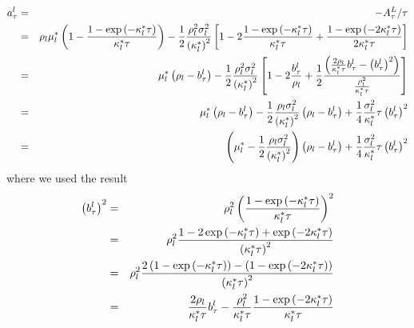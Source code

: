 \documentclass{article}
\begin{document}
\begin{eqnarray*}
a_{\tau }^{l} &=&-A_{\tau }^{L}/\tau  \\
&=&\rho _{l}\mu _{l}^{\ast }\left( 1-\frac{1-\exp \left( -\kappa _{l}^{\ast
}\tau \right) }{\kappa _{l}^{\ast }\tau }\right) -\frac{1}{2}\frac{\rho
_{l}^{2}\sigma _{l}^{2}}{\left( \kappa _{l}^{\ast }\right) ^{2}}\left[ 1-2%
\frac{1-\exp \left( -\kappa _{l}^{\ast }\tau \right) }{\kappa _{l}^{\ast
}\tau }+\frac{1-\exp \left( -2\kappa _{l}^{\ast }\tau \right) }{2\kappa
_{l}^{\ast }\tau }\right]  \\
&=&\mu _{l}^{\ast }\left( \rho _{l}-b_{\tau }^{l}\right) -\frac{1}{2}\frac{%
\rho _{l}^{2}\sigma _{l}^{2}}{\left( \kappa _{l}^{\ast }\right) ^{2}}\left[
1-2\frac{b_{\tau }^{l}}{\rho _{l}}+\frac{1}{2}\frac{\left( \frac{2\rho _{l}}{%
\kappa _{l}^{\ast }\tau }b_{\tau }^{l}-\left( b_{\tau }^{l}\right)
^{2}\right) }{\frac{\rho _{l}^{2}}{\kappa _{l}^{\ast }\tau }}\right]  \\
&=&\mu _{l}^{\ast }\left( \rho _{l}-b_{\tau }^{l}\right) -\frac{1}{2}\frac{%
\rho _{l}\sigma _{l}^{2}}{\left( \kappa _{l}^{\ast }\right) ^{2}}\left( \rho
_{l}-b_{\tau }^{l}\right) +\frac{1}{4}\frac{\sigma _{l}^{2}}{\kappa
_{l}^{\ast }}\tau \left( b_{\tau }^{l}\right) ^{2} \\
&=&\left( \mu _{l}^{\ast }-\frac{1}{2}\frac{\rho _{l}\sigma _{l}^{2}}{\left(
\kappa _{l}^{\ast }\right) ^{2}}\right) \left( \rho _{l}-b_{\tau
}^{l}\right) +\frac{1}{4}\frac{\sigma _{l}^{2}}{\kappa _{l}^{\ast }}\tau
\left( b_{\tau }^{l}\right) ^{2}
\end{eqnarray*}%
where we used the result%
\begin{eqnarray*}
\left( b_{\tau }^{l}\right) ^{2} &=&\rho _{l}^{2}\left( \frac{1-\exp \left(
-\kappa _{l}^{\ast }\tau \right) }{\kappa _{l}^{\ast }\tau }\right) ^{2} \\
&=&\rho _{l}^{2}\frac{1-2\exp \left( -\kappa _{l}^{\ast }\tau \right) +\exp
\left( -2\kappa _{l}^{\ast }\tau \right) }{\left( \kappa _{l}^{\ast }\tau
\right) ^{2}} \\
&=&\rho _{l}^{2}\frac{2\left( 1-\exp \left( -\kappa _{l}^{\ast }\tau \right)
\right) -\left( 1-\exp \left( -2\kappa _{l}^{\ast }\tau \right) \right) }{%
\left( \kappa _{l}^{\ast }\tau \right) ^{2}} \\
&=&\frac{2\rho _{l}}{\kappa _{l}^{\ast }\tau }b_{\tau }^{l}-\frac{\rho
_{l}^{2}}{\kappa _{l}^{\ast }\tau }\frac{1-\exp \left( -2\kappa _{l}^{\ast
}\tau \right) }{\kappa _{l}^{\ast }\tau }
\end{eqnarray*}
\end{document}
